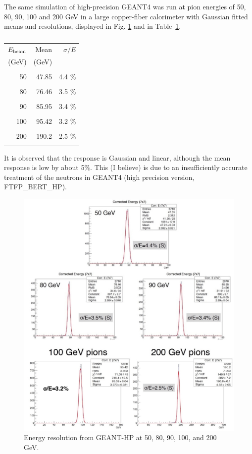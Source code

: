 The same simulation of high-precision GEANT4 was run at pion energies of 50, 80, 90, 100 and 200 GeV in a large
copper-fiber calorimeter with Gaussian fitted  means and resolutions, displayed in Fig. \ref{fig:eres} and in Table~\ref{tab:dream:pionEnergies}.
\begin{table}
  \centering
\begin{tabular}{ r r r }
$E_{\rm beam}$   &  Mean         &  $\sigma/E$ \\
   (GeV)    &   (GeV)       &   \\
\hline
 & & \\
 50    &    47.85   & 4.4 \% \\
 &&\\
 80   & 76.46     &  3.5 \% \\
 &&\\
 90  & 85.95    &   3.4 \% \\
 &&\\
 100  & 95.42  &  3.2 \% \\
 &&\\
 200  & 190.2  &  2.5 \% \\
 &&\\
 \end{tabular}
 \caption{}
 \label{tab:dream:pionEnergies}
\end{table}

 It is observed that the response is Gaussian and linear, although the mean response is low by about 5\%.  This (I believe) is due to an insufficiently accurate treatment of the neutrons in GEANT4 (high precision version, FTFP\_BERT\_HP).

\begin{figure}
 \centering
 \includegraphics[width=0.5\linewidth]{Calorimeter/DualReadout/eres.jpg}
  \caption{Energy resolution from GEANT-HP at 50, 80, 90, 100, and 200 GeV.}
  \label{fig:eres}
\end{figure}


